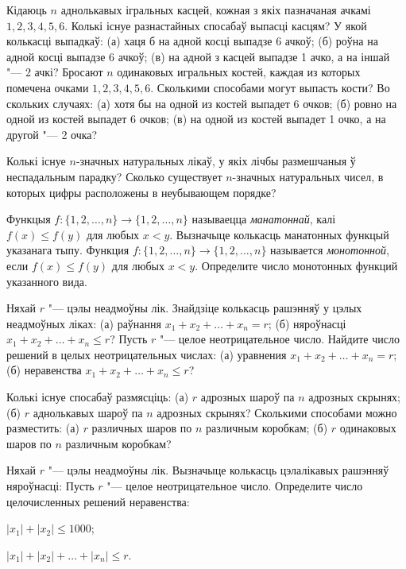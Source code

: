 \begin{problemList}
\bigskip

\problemItemSimple
{Кідаюць $n$ аднолькавых ігральных касцей, кожная з якіх пазначаная ачкамі $1, 2, 3, 4, 5, 6$.
Колькі існуе разнастайных спосабаў выпасці касцям? У якой колькасці выпадкаў:
(а) хаця б на адной косці выпадзе 6 ачкоў; (б) роўна на адной косці выпадзе 6 ачкоў;
(в) на адной з касцей выпадзе 1 ачко, а на іншай "--- 2 ачкі?}
{Бросают $n$ одинаковых игральных костей, каждая из которых помечена
очками $1, 2, 3, 4, 5, 6$. Сколькими способами могут выпасть кости?
Во скольких случаях: (а) хотя бы на одной из костей выпадет 6 очков;
(б) ровно на одной из костей выпадет 6 очков; (в) на одной из костей
выпадет 1 очко, а на другой "--- 2 очка?}

\bigskip

\problemItemSimple
{Колькі існуе $n$-значных натуральных лікаў, у якіх лічбы размешчаныя ў неспадальным парадку?}
{Сколько существует $n$-значных натуральных чисел, в
которых цифры расположены в неубывающем порядке?}

\bigskip

\problemItemSimple
{Функцыя $f \colon \{1, 2, \ldots, n\} \to \{1, 2, \ldots, n\}$
называецца \emph{манатоннай}, калі $f(x) \le f(y)$ для любых $x < y$.
Вызначыце колькасць манатонных функцый указанага тыпу.}
{Функция $f \colon \{1, 2, \ldots, n\} \to \{1, 2, \ldots, n\}$
называется \emph{монотонной}, если $f(x) \le f(y)$ для любых $x < y$.
Определите число монотонных функций указанного вида.}

\bigskip

\problemItemSimple
{Няхай $r$ "--- цэлы неадмоўны лік. Знайдзіце колькасць рашэнняў у цэлых
неадмоўных ліках: (а) раўнання $x_1 + x_2 + \ldots + x_n = r$;
(б) няроўнасці $x_1 + x_2 + \ldots + x_n \le r$?}
{Пусть $r$ "--- целое неотрицательное число. Найдите число решений в
целых неотрицательных числах: (а) уравнения
$x_1 + x_2 + \ldots + x_n = r$; (б) неравенства
$x_1 + x_2 + \ldots + x_n \le r$?}

\bigskip

\problemItemSimple
{Колькі існуе спосабаў размясціць: (а) $r$ адрозных шароў па $n$
адрозных скрынях; (б) $r$ аднолькавых шароў па $n$ адрозных скрынях?}
{Сколькими способами можно разместить: (а) $r$ различных шаров по $n$
различным коробкам; (б) $r$ одинаковых шаров по $n$ различным коробкам?}

\bigskip

\problemItemWithCommonPart
{Няхай $r$ "--- цэлы неадмоўны лік. Вызначыце колькасць цэлалікавых рашэнняў няроўнасці:}
{Пусть $r$ "--- целое неотрицательное число. Определите число
целочисленных решений неравенства:}
{%
\begin{belarusianEnumerate}
  \item $|x_1| + |x_2| \le 1000$;
  \item $|x_1| + |x_2| + \ldots + |x_n| \le r$.
\end{belarusianEnumerate}
}


\end{problemList}
